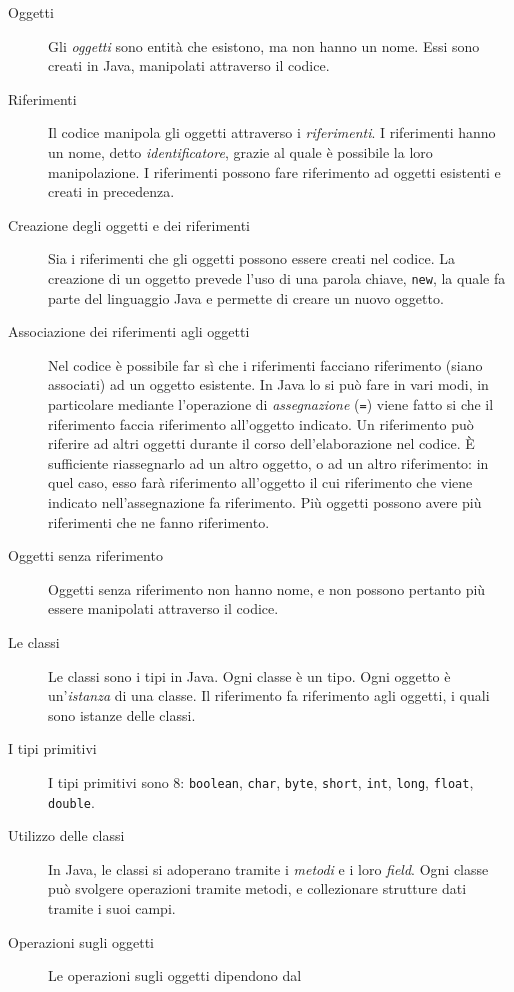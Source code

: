 \documentclass[\fontsizeclass,twocolumn]{\classname}
\theoremstyle{definition}
\theoremstyle{definition}
\begin{document}
\begin{description}
  \item[Oggetti] Gli \emph{oggetti} sono entità che esistono, ma non hanno un nome. Essi
  sono creati in Java, manipolati attraverso il codice. 
  \item[Riferimenti] Il codice manipola gli oggetti attraverso i \emph{riferimenti}. I
  riferimenti hanno un nome, detto \emph{identificatore}, grazie al quale è
  possibile la loro manipolazione. I riferimenti possono fare riferimento ad
  oggetti esistenti e creati in precedenza.
  \item[Creazione degli oggetti e dei riferimenti] Sia i riferimenti che gli
  oggetti possono essere creati nel codice. La creazione di un oggetto prevede
  l'uso di una parola chiave, \texttt{new}, la quale fa parte del linguaggio
  Java e permette di creare un nuovo oggetto.
  \item[Associazione dei riferimenti agli oggetti] Nel codice è possibile far sì
  che i riferimenti facciano riferimento (siano associati) ad un oggetto
  esistente. In Java lo si può fare in vari modi, in particolare mediante
  l'operazione di \emph{assegnazione} (\texttt{=}) viene fatto si che il
  riferimento faccia riferimento all'oggetto indicato. Un riferimento può
  riferire ad altri oggetti durante il corso dell'elaborazione nel codice. È
  sufficiente riassegnarlo ad un altro oggetto, o ad un altro riferimento:
  in quel caso, esso farà riferimento all'oggetto il cui riferimento che viene
  indicato nell'assegnazione fa riferimento. Più oggetti possono avere più
  riferimenti che ne fanno riferimento.
  \item[Oggetti senza riferimento] Oggetti senza riferimento non hanno nome, e
  non possono pertanto più essere manipolati attraverso il codice.
  \item[Le classi] Le classi sono i tipi in Java. Ogni classe è un tipo. Ogni
  oggetto è un'\emph{istanza} di una classe. Il riferimento fa riferimento agli
  oggetti, i quali sono istanze delle classi.
  \item[I tipi primitivi] I tipi primitivi sono $8$: \texttt{boolean},
  \texttt{char}, \texttt{byte}, \texttt{short}, \texttt{int}, \texttt{long},
  \texttt{float}, \texttt{double}.
  \item[Utilizzo delle classi] In Java, le classi si adoperano tramite i
  \emph{metodi} e i loro \emph{field}. Ogni classe può svolgere operazioni
  tramite metodi, e collezionare strutture dati tramite i suoi campi.
  \item[Operazioni sugli oggetti] Le operazioni sugli oggetti dipendono dal

\end{description}
\end{document}
